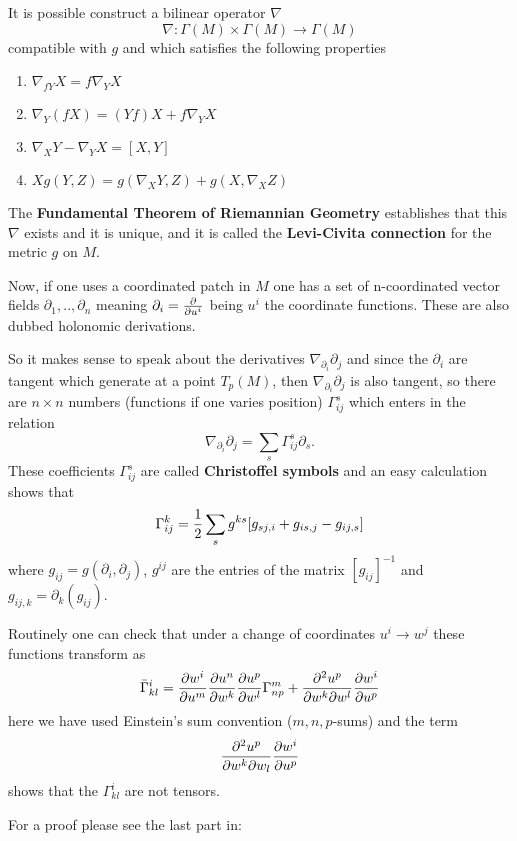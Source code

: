 \documentclass[12pt]{article}
\begin{document}
It is possible construct a bilinear operator $\nabla$
$$\nabla\colon \Gamma(M)\times\Gamma(M)\to\Gamma(M)$$
compatible with $g$ and which satisfies the following properties

\begin{enumerate}
\item $\nabla_{fY}X=f\nabla_YX$
\item $\nabla_Y(fX)=(Yf)X+ f\nabla_YX$
\item $\nabla_XY-\nabla_YX=[X,Y]$
\item $Xg(Y,Z)=g(\nabla_XY,Z)+g(X,\nabla_XZ)$
\end{enumerate} 

The {\bf Fundamental Theorem of Riemannian Geometry} establishes that this $\nabla$ exists and it is unique, 
and it is called the {\bf Levi-Civita connection} for the metric $g$ on $M$.

Now, if one uses a coordinated patch in $M$ one has a set of n-coordinated vector fields $\partial_1,..,\partial_n$
meaning $\partial_i={{\partial}\over{\partial u^i}}$ being $u^i$ the coordinate functions.
These are also dubbed holonomic derivations.

So it makes sense to speak about the derivatives $\nabla_{\partial_i}\partial_j$
and since the $\partial_i$ are tangent which generate at a point $T_p(M)$, then $\nabla_{\partial_i}\partial_j$
is also tangent, so there are $n\times n$ numbers (functions if one varies position) $\Gamma^s_{ij}$ which enters 
in the relation
$$\nabla_{\partial_i}\partial_j=\sum_s\Gamma^s_{ij}\partial_s.$$
These coefficients $\Gamma^s_{ij}$ are called {\bf Christoffel symbols} and an easy calculation shows that
$$\Gamma^k_{ij}={1\over 2}\sum_sg^{ks}[g_{sj,i}+g_{is,j}-g_{ij,s}]$$ 
where  $g_{ij}=g(\partial_i,\partial_j)$, $g^{ij}$ are the entries of the matrix $[g_{ij}]^{-1}$ and 
$g_{ij,k}=\partial_k(g_{ij})$.

Routinely one can check that under a change of coordinates $u^i\to w^j$ these functions transform as
$$\bar{\Gamma}^i_{kl}=
{{\partial w^i}\over{\partial u^m}}{{\partial u^n}\over{\partial w^k}}{{\partial u^p}\over{\partial w^l}}
\Gamma^m_{np}+{{\partial}^2u^p\over{\partial w^k\partial w^l}}{{\partial w^i}\over{\partial u^p}}
$$
here we have used Einstein's sum convention ($m,n,p$-sums) and the term 
$${
{\partial}^2u^p\over{\partial w^k\partial w_l}
}
{
{\partial w^i}\over{\partial u^p}
}$$ 
shows that the $\Gamma^i_{kl}$ are not tensors.

For a proof please see the last part in:
\end{document}
